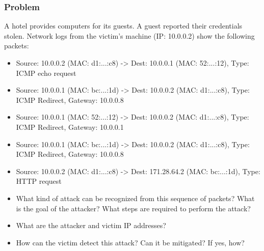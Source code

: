 \documentclass{article}
\begin{document}
\subsubsection*{Problem}
A hotel provides computers for its guests. A guest reported their credentials stolen. Network logs from the victim's machine (IP: 10.0.0.2) show the following packets:
\begin{itemize}
    \item[\textbf{1.}] Source: 10.0.0.2 (MAC: d1:...:c8) -> Dest: 10.0.0.1 (MAC: 52:...:12), Type: ICMP echo request
    \item[\textbf{2.}] Source: 10.0.0.1 (MAC: bc:...:1d) -> Dest: 10.0.0.2 (MAC: d1:...:c8), Type: ICMP Redirect, Gateway: 10.0.0.8
    \item[\textbf{3.}] Source: 10.0.0.1 (MAC: 52:...:12) -> Dest: 10.0.0.2 (MAC: d1:...:c8), Type: ICMP Redirect, Gateway: 10.0.0.1
    \item[\textbf{4.}] Source: 10.0.0.1 (MAC: bc:...:1d) -> Dest: 10.0.0.2 (MAC: d1:...:c8), Type: ICMP Redirect, Gateway: 10.0.0.8
    \item[\textbf{5.}] Source: 10.0.0.2 (MAC: d1:...:c8) -> Dest: 171.28.64.2 (MAC: bc:...:1d), Type: HTTP request

    \item[\textbf{1.}] [3 points] What kind of attack can be recognized from this sequence of packets? What is the goal of the attacker? What steps are required to perform the attack?
    \item[\textbf{2.}] [1 point] What are the attacker and victim IP addresses?
    \item[\textbf{3.}] [2 points] How can the victim detect this attack? Can it be mitigated? If yes, how?
\end{itemize}
\end{document}

